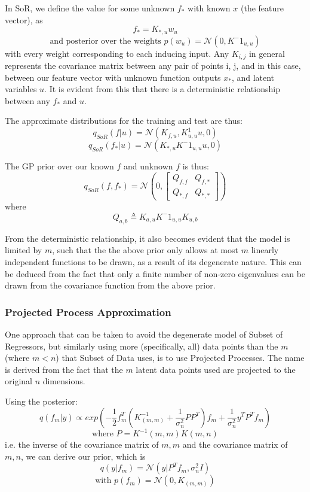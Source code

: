 \documentclass[10pt,sts]{article}
\begin{document}
\begin{multicols}{2}
    In SoR, we define the value for some unknown $f_*$ with known $x$ (the feature vector), as $$f_* = K_{*,u}w_u$$ $$\textrm{and posterior over the weights } p(w_u) = \mathcal{N}(0, K^-1_{u,u})$$ with every weight corresponding to each inducing input. Any $K_{i, j}$ in general represents the covariance matrix between any pair of points i, j, and in this case, between our feature vector with unknown function outputs $x_*$, and latent variables $u$. It is evident from this that there is a deterministic relationship between any $f_*$ and $u$.

    The approximate distributions for the training and test are thus:
    $$q_{SoR}(f|u) = \mathcal{N}(K_{f,u},K^1_{u,u}u, 0)$$
    $$q_{SoR}(f_*|u) = \mathcal{N}(K_{*,u}K^-1_{u,u}u, 0)$$

    The GP prior over our known $f$ and unknown $f$ is thus:
    $$q_{SoR}(f, f_*) = \mathcal{N}(0, \left[
    \begin{matrix}
        Q_{f,f} & Q_{f,*} \\
        Q_{*,f} & Q_{*,*}
    \end{matrix}\right])
    $$
    where $$Q_{a,b} \triangleq K_{a,u}K^-1_{u,u}K_{u,b} $$

    From the deterministic relationship, it also becomes evident that the model is limited by $m$, such that the the above prior only allows at most $m$ linearly independent functions to be drawn, as a result of its degenerate nature. This can be deduced from the fact that only a finite number of non-zero eigenvalues can be drawn from the covariance function from the above prior.

    \subsubsection{Projected Process Approximation} 

    One approach that can be taken to avoid the degenerate model of Subset of Regressors, but similarly using more (specifically, all) data points than the $m$ (where $m < n$) that Subset of Data uses, is to use Projected Processes. The name is derived from the fact that the $m$ latent data points used are projected to the original $n$ dimensions.

    Using the posterior:
    $$ q(f_m | y) \propto exp\left( -\frac{1}{2}f^T_m(K^{-1}_{(m,m)} + \frac{1}{\sigma^2_n}PP^T)f_m + \frac{1}{\sigma^2_n}y^TP^Tf_m  \right)$$
    $$ \textrm{where } P = K^{-1}{(m,m)}K{(m,n)} $$
    i.e. the inverse of the covariance matrix of $m, m$ and the covariance matrix of $m, n$, we can derive our prior, which is
    $$ q(y|f_m) = \mathcal{N}(y|P^Tf_m,\sigma^2_nI) $$
    $$ \textrm{with } p(f_m) = \mathcal{N}(0, K_{(m,m)})$$


\end{multicols}
\end{document}
